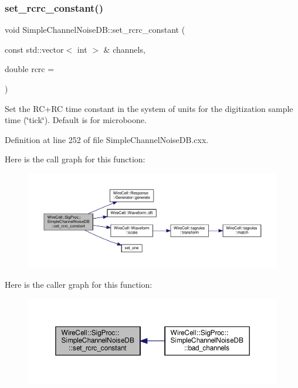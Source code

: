 \subsubsection{\texorpdfstring{set\+\_\+rcrc\+\_\+constant()}{set\_rcrc\_constant()}}
{\footnotesize\ttfamily void Simple\+Channel\+Noise\+D\+B\+::set\+\_\+rcrc\+\_\+constant (\begin{DoxyParamCaption}\item[{const std\+::vector$<$ int $>$ \&}]{channels,  }\item[{double}]{rcrc = {} }\end{DoxyParamCaption})}

Set the R\+C+\+RC time constant in the system of units for the digitization sample time (\char`\"{}tick\char`\"{}). Default is for microboone. 

Definition at line 252 of file Simple\+Channel\+Noise\+D\+B.\+cxx.

Here is the call graph for this function\+:
\nopagebreak
\begin{figure}[H]
\begin{center}
\leavevmode
\includegraphics[width=350pt]{class_wire_cell_1_1_sig_proc_1_1_simple_channel_noise_d_b_a1c4c378e91ff2ead5aff08bc3615b1d2_cgraph}
\end{center}
\end{figure}
Here is the caller graph for this function\+:
\nopagebreak
\begin{figure}[H]
\begin{center}
\leavevmode
\includegraphics[width=350pt]{class_wire_cell_1_1_sig_proc_1_1_simple_channel_noise_d_b_a1c4c378e91ff2ead5aff08bc3615b1d2_icgraph}
\end{center}
\end{figure}
\mbox{\label{class_wire_cell_1_1_sig_proc_1_1_simple_channel_noise_d_b_ae5a4c212b9589940124fcce6075f8996}} 
